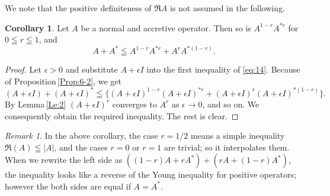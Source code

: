 \documentclass[reqno]{amsart}
\theoremstyle{definition}
\newtheorem{corollary}[theorem]{Corollary}
\theoremstyle{remark}
\newtheorem{remark}[theorem]{Remark}
\begin{document}
 We note that the positive definiteness of $\Re{A}$ 
is not assumed in the following.
 \begin{corollary}\label{Cor:6-4}
Let $A$ be a normal and accretive operator.
Then so is $A^{1-r} A^{*r}$ for $0\leqq r \leqq1$, and  
$$A + A^* \leqq   A^{1-r} A^{*r} + A^r A^{*(1-r)} .$$
\end{corollary}
\begin{proof} Let $\epsilon>0$ and substitute  $A+\epsilon I $ into the first 
inequality of \eqref{eq:14}. Because of Proposition\,\ref{Prop:6-2},  we get 
$$(A + \epsilon I) + (A + \epsilon I)^* \leqq \{ (A+ \epsilon I)^{1-r}
 (A + \epsilon I)^{*r} + (A + \epsilon I)^r (A+ \epsilon I)^{*(1-r)} \}.$$
By Lemma\,\ref{Le:2} $(A + \epsilon I)^r$ converges to $A^r$ as $\epsilon \to 0$, and so on. 
We consequently obtain the required inequality. The rest is clear.
\end{proof}
 \begin{remark}\rm
In the above corollary, the case $r=1/2$ means a simple inequality 
$\Re(A) \leqq |A|$, and the cases $r=0$ or $r=1$ are trivial; so it interpolates them. 
When we rewrite the left side as $((1-r)A + r A^*) + (r A + (1-r) A^*)$, the inequality looks 
like a reverse of the Young inequality for positive operators; however the both sides are equal 
if $A=A^*$.  
%  
\end{remark}
\end{document}

